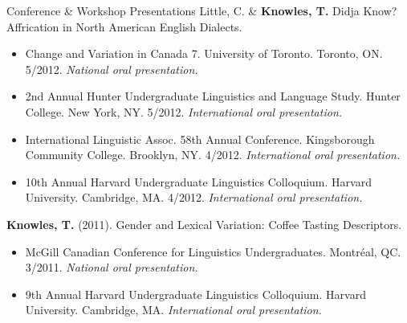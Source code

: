 \documentclass{resume} %
\begin{document}
\begin{rSection}{Conference \& Workshop Presentations}
	Little, C. \& {\bf Knowles, T.} Didja Know? Affrication in North American English Dialects.
	\begin{itemize}
				\renewcommand\labelitemi{$\cdot$}
		\item Change and Variation in Canada 7. University of Toronto. Toronto, ON. 5/2012. \emph{National oral presentation.}
		\item 2nd Annual Hunter Undergraduate Linguistics and Language Study. Hunter College. New York, NY. 5/2012. \emph{International oral presentation.}
		\item International Linguistic Assoc. 58th Annual Conference. Kingsborough Community College. Brooklyn, NY. 4/2012. \emph{International oral presentation.}
		\item 10th Annual Harvard Undergraduate Linguistics Colloquium. Harvard University. Cambridge, MA. 4/2012. \emph{International oral presentation.}
	\end{itemize}
	
	{\bf Knowles, T.} (2011). Gender and Lexical Variation: Coffee Tasting Descriptors. 
	\begin{itemize}
				\renewcommand\labelitemi{$\cdot$}
		\item McGill Canadian Conference for Linguistics Undergraduates. Montr\'eal, QC. 3/2011. \emph{National oral presentation.}
		\item 9th Annual Harvard Undergraduate Linguistics Colloquium. Harvard University. Cambridge, MA. \emph{International oral presentation.}
	\end{itemize}

\end{rSection}
\end{document}
